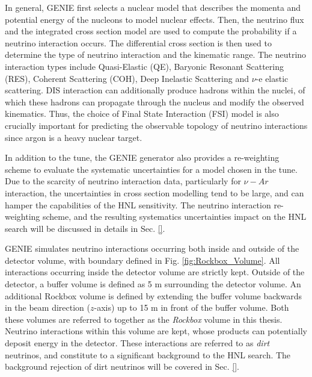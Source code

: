 In general, GENIE first selects a nuclear model that describes the momenta and potential energy of the nucleons to model nuclear effects.
Then, the neutrino flux and the integrated cross section model are used to compute the probability if a neutrino interaction occurs.
The differential cross section is then used to determine the type of neutrino interaction and the kinematic range.
The neutrino interaction types include Quasi-Elastic (QE), Baryonic Resonant Scattering (RES), Coherent Scattering (COH), Deep Inelastic Scattering and $\nu$-e elastic scattering.
DIS interaction can additionally produce hadrons within the nuclei, of which these hadrons can propagate through the nucleus and modify the observed kinematics.
Thus, the choice of Final State Interaction (FSI) model is also crucially important for predicting the observable topology of neutrino interactions since argon is a heavy nuclear target.

In addition to the tune, the GENIE generator also provides a re-weighting scheme to evaluate the systematic uncertainties for a model chosen in the tune.
Due to the scarcity of neutrino interaction data, particularly for $\nu-Ar$ interaction, the uncertainties in cross section modelling tend to be large, and can hamper the capabilities of the HNL sensitivity.  
The neutrino interaction re-weighting scheme, and the resulting systematics uncertainties impact on the HNL search will be discussed in details in Sec. \ref{}.


GENIE simulates neutrino interactions occurring both inside and outside of the detector volume, with boundary defined in Fig. \ref{fig:Rockbox_Volume}.  
All interactions occurring inside the detector volume are strictly kept.
Outside of the detector, a buffer volume is defined as 5 m surrounding the detector volume.
An additional Rockbox volume is defined by extending the buffer volume backwards in the beam direction ($z$-axis) up to 15 m in front of the buffer volume.
Both these volumes are referred to together as the \textit{Rockbox} volume in this thesis.
Neutrino interactions within this volume are kept, whose products can potentially deposit energy in the detector.
These interactions are referred to as \textit{dirt} neutrinos, and constitute to a significant background to the HNL search.
The background rejection of dirt neutrinos will be covered in Sec. \ref{}.

